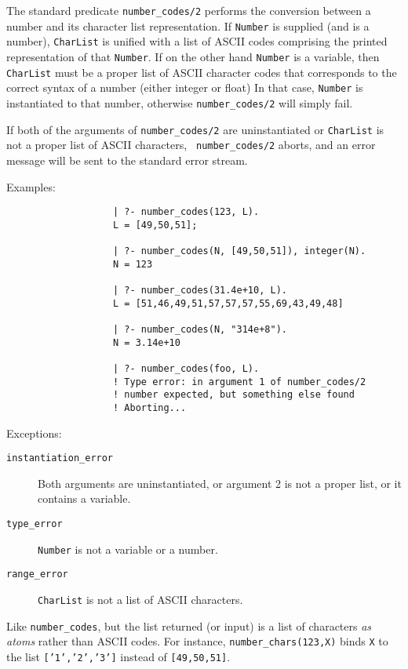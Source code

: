 \begin{description}
    The standard predicate {\tt number\_codes/2} performs the conversion 
    between a number and its character list representation. 
    If {\tt Number} is supplied (and is a number), {\tt CharList} is
    unified with a list of ASCII codes comprising the printed representation
    of that {\tt Number}.  If on the other hand {\tt Number} is a variable, 
    then {\tt CharList} must be a proper list of ASCII character codes that
    corresponds to the correct syntax of a number (either integer or float)
    In that case, {\tt Number} is instantiated to that number, otherwise
    {\tt number\_codes/2} will simply fail.

    If both of the arguments of {\tt number\_codes/2} are uninstantiated or
    {\tt CharList} is not a proper list of ASCII characters, {\tt
    number\_codes/2} aborts, and an error message will be sent to
    the standard error stream.

    Examples:
    {\footnotesize
     \begin{verbatim}
                   | ?- number_codes(123, L).
                   L = [49,50,51];

                   | ?- number_codes(N, [49,50,51]), integer(N).
                   N = 123

                   | ?- number_codes(31.4e+10, L).
                   L = [51,46,49,51,57,57,57,55,69,43,49,48]

                   | ?- number_codes(N, "314e+8").
                   N = 3.14e+10

                   | ?- number_codes(foo, L).
                   ! Type error: in argument 1 of number_codes/2
                   ! number expected, but something else found
                   ! Aborting...
     \end{verbatim}}

    Exceptions:
    \begin{description}
    \item[{\tt instantiation\_error}]
	Both arguments are uninstantiated, or argument 2
	is not a proper list, or it contains a variable.
    \item[{\tt type\_error}]
	{\tt Number} is not a variable or a number.
    \item[{\tt range\_error}]
	{\tt CharList} is not a list of ASCII characters.
    \end{description}

    Like \verb|number_codes|, but the list returned (or input) is a list of
    characters \emph{as atoms} rather than ASCII codes. For instance, 
    \verb|number_chars(123,X)| binds {\tt X} to the list {\tt ['1','2','3']}
    instead of {\tt [49,50,51]}.


\end{description}
